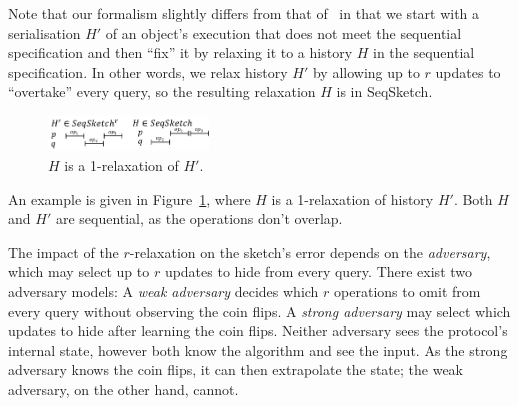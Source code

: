 Note that our formalism slightly differs from that of~\cite{Henzinger} in that we start with a serialisation $H'$ of an object’s
execution that does not meet the sequential specification and then ``fix'' it by relaxing it to a history $H$ in the sequential
specification. In other words, we relax history $H'$ by allowing up to $r$ updates to ``overtake'' every query, so the
resulting relaxation $H$ is in SeqSketch.
\begin{figure}[h]
    \begin{center}
      \includegraphics[width=0.38\textwidth]{images/relaxationExample}
    \end{center}
    \caption{$H$ is a 1-relaxation of $H'$.}
    \label{fig:relaxationExample}
\end{figure}

An example is given in Figure~\ref{fig:relaxationExample}, where $H$ is a 1-relaxation of history $H'$.
Both $H$ and $H'$ are sequential, as the operations don't overlap.

The impact of the $r$-relaxation on the sketch's error depends on the \emph{adversary}, which may select up to 
$r$ updates to hide from every query. There exist two adversary models:   
A \emph{weak adversary} decides which $r$ operations to omit from 
every query without observing the coin flips. 
A \emph{strong adversary} may select which updates to hide after learning 
the coin flips. Neither adversary sees the protocol's internal state, however both know the algorithm
and see the input. As the strong adversary knows the coin flips, it can then extrapolate the state; the
weak adversary, on the other hand, cannot.


